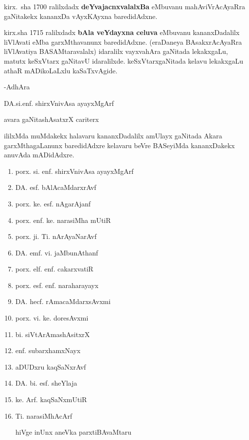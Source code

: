 kirx.~sha {\rm 1700} ralilxdadx \textbf{deYvajacnxvalalxBa} eMbuvanu mahAviVrAcAyaRra gaNitakekx kananxDa vAyxKAyxna baredidAdxne.

kirx.sha {\rm 1715} ralilxdadx \textbf{bAla veYdayxna celuva} eMbuvanu kananxDadalilx liVlAvati eMba garxMthavanunx baredidAdxne. (eraDaneya BAsakxrAcAyaRra liVlAvatiya BASAMtaravalalx) idaralilx vayxvahAra gaNitada lekakxgaLu, matutx keSxVtarx gaNitavU idaralilxde. keSxVtarxgaNitada kelavu lekakxgaLu athaR mADikoLaLxlu kaSaTxvAgide.

\medskip
\hfill{-AdhAra}\hspace{1.8cm}

\hfill{DA.si.enf. shirxVnivAsa ayayxMgArf}

\hfill{avara gaNitashAsatxrX cariterx}\hspace{1cm}

ililxMda muMdakekx halavaru kananxDadalilx amUlayx gaNitada Akara garxMthagaLanunx baredidAdxre kelavaru beVre BASeyiMda kananxDakekx anuvAda mADidAdxre.

\begin{enumerate}[\rm 1)]
\item porx. si. enf. shirxVnivAsa ayayxMgArf

\item DA. esf. bAlAcaMdarxrAvf

\item porx. ke. esf. nAgarAjanf

\item porx. enf. ke. narasiMha mUtiR

\item porx. ji. Ti. nArAyaNarAvf

\item DA. emf. vi. jaMbunAthanf

\item porx. elf. enf. cakarxvatiR

\item porx. esf. enf. naraharayayx

\item DA. hecf. rAmacaMdarxsAvxmi

\item porx. vi. ke. doresAvxmi

\item bi. siVtArAmashAsitxrX

\item enf. subarxhamxNayx

\item aDUDxru kaqSaNxrAvf

\item DA. bi. esf. sheYlaja

\item ke. Arf. kaqSaNxmUtiR

\item Ti. narasiMhAcArf

hiVge inUnx aneVka parxtiBAvaMtaru
\end{enumerate}

